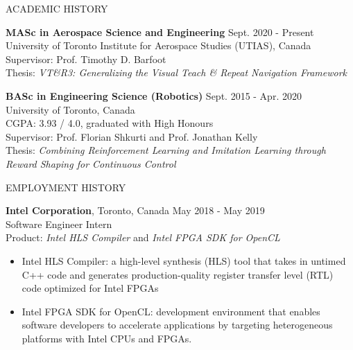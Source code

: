 \documentclass{cv}
\begin{document}

\begin{rSection}{ACADEMIC HISTORY}
  \item {\bf MASc in Aerospace Science and Engineering} \hfill {Sept. 2020 - Present}\\
  University of Toronto Institute for Aerospace Studies (UTIAS), Canada\\
  Supervisor: Prof. Timothy D. Barfoot\\
  Thesis: \textit{VT\&R3: Generalizing the Visual Teach \& Repeat Navigation Framework}

  \item {\bf BASc in Engineering Science (Robotics)} \hfill {Sept. 2015 - Apr. 2020}\\
  University of Toronto, Canada\\
  CGPA: 3.93 / 4.0, graduated with High Honours\\
  Supervisor: Prof. Florian Shkurti and Prof. Jonathan Kelly\\
  Thesis: \textit{Combining Reinforcement Learning and Imitation Learning through Reward Shaping for Continuous Control}
\end{rSection}

\begin{rSection}{EMPLOYMENT HISTORY}
  \item \textbf{Intel Corporation}, Toronto, Canada  \hfill {May 2018 - May 2019}\\
  Software Engineer Intern\\
  Product: \textit{Intel HLS Compiler} and \textit{Intel FPGA SDK for OpenCL}
  \vspace{-0.5em}
  \begin{itemize}[noitemsep,topsep=0pt]
    \item Intel HLS Compiler: a high-level synthesis (HLS) tool that takes in untimed C++ code and generates production-quality register transfer level (RTL) code optimized for Intel FPGAs
    \item Intel FPGA SDK for OpenCL: development environment that enables software developers to accelerate applications by targeting heterogeneous platforms with Intel CPUs and FPGAs.
  \end{itemize}
\end{rSection}
\end{document}
